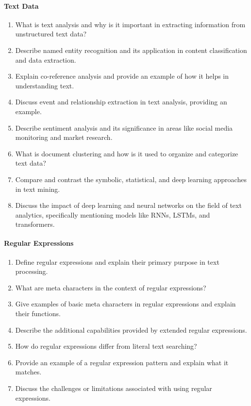 \paragraph*{Text Data}
\begin{enumerate}
    \item What is text analysis and why is it important in extracting information from unstructured text data?
    \item Describe named entity recognition and its application in content classification and data extraction.
    \item Explain co-reference analysis and provide an example of how it helps in understanding text.
    \item Discuss event and relationship extraction in text analysis, providing an example.
    \item Describe sentiment analysis and its significance in areas like social media monitoring and market research.
    \item What is document clustering and how is it used to organize and categorize text data?
    \item Compare and contrast the symbolic, statistical, and deep learning approaches in text mining.
    \item Discuss the impact of deep learning and neural networks on the field of text analytics, specifically mentioning models like RNNs, LSTMs, and transformers.
\end{enumerate}
\begin{advanced}
\paragraph*{Regular Expressions}
\begin{enumerate}
    \item Define regular expressions and explain their primary purpose in text processing.
    \item What are meta characters in the context of regular expressions?
    \item Give examples of basic meta characters in regular expressions and explain their functions.
    \item Describe the additional capabilities provided by extended regular expressions.
    \item How do regular expressions differ from literal text searching?
    \item Provide an example of a regular expression pattern and explain what it matches.
    \item Discuss the challenges or limitations associated with using regular expressions.
\end{enumerate}
\end{advanced}

